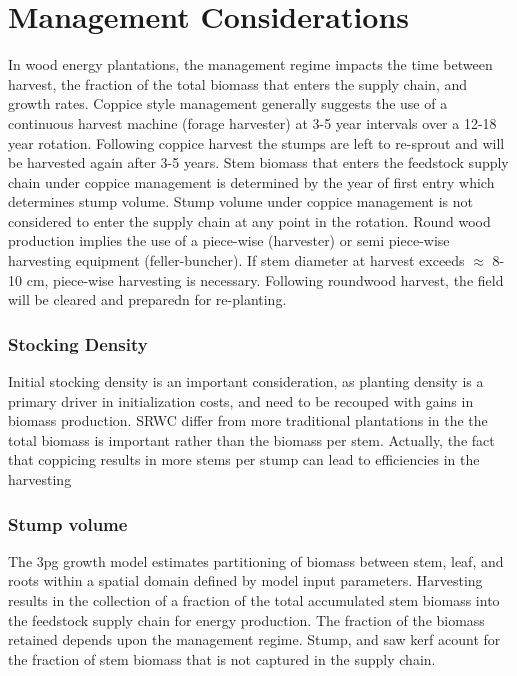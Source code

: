 \documentclass[10pt]{article}
\begin{document}
\section*{Management Considerations}
\label{sec:management-reg}

In wood energy plantations, the management regime impacts the time
between harvest, the fraction of the total biomass that enters the
supply chain, and growth rates. Coppice style management generally
suggests the use of a continuous harvest machine (forage harvester) at
3-5 year intervals over a 12-18 year rotation. Following coppice
harvest the stumps are left to re-sprout and will be harvested again
after 3-5 years.  Stem biomass that enters the feedstock supply chain
under coppice management is determined by the year of first entry
which determines stump volume.  Stump volume under coppice management
is not considered to enter the supply chain at any point in the
rotation. Round wood production implies the use of a piece-wise
(harvester) or semi piece-wise harvesting equipment
(feller-buncher). If stem diameter at harvest exceeds $\approx$ 8-10
cm, piece-wise harvesting is necessary. Following roundwood harvest,
the field will be cleared and preparedn for re-planting.


\subsubsection*{Stocking Density}
\label{sec:stocking-density}

Initial stocking density is an important consideration, as planting
density is a primary driver in initialization costs, and need to be
recouped with gains in biomass production.  \ac{SRWC} differ from
more traditional plantations in the the total biomass is important
rather than the biomass per stem.  Actually, the fact that coppicing
results in more stems per stump can lead to efficiencies in the
harvesting 

\subsubsection*{Stump volume}
\label{sec:stump-volume}

The \ac{3pg} growth model estimates partitioning of biomass between stem,
leaf, and roots within a spatial domain defined by model input
parameters. Harvesting results in the collection of a fraction of the
total accumulated stem biomass into the feedstock supply chain for
energy production. The fraction of the biomass retained depends upon
the management regime. Stump, and saw kerf acount for the fraction of
stem biomass that is not captured in the supply chain.
\end{document}
